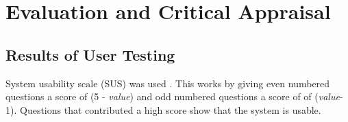 \section{Evaluation and Critical Appraisal}

\subsection{Results of User Testing}

System usability scale (SUS) was used \cite{SUS}. This works by giving even numbered questions a score of (5 - \emph{value}) and odd numbered questions a score of of (\emph{value}-1). Questions that contributed a high score show that the system is usable. 

  
